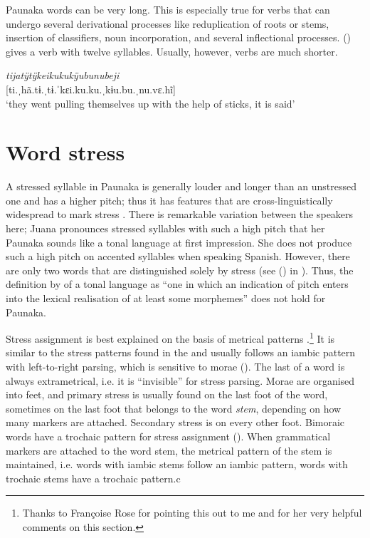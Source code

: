 Paunaka words can be very long. This is especially true for verbs that can undergo several derivational processes like reduplication of roots or stems, insertion of classifiers, noun incorporation, and several inflectional processes. () gives a verb with twelve syllables. Usually, however, verbs are much shorter.


\ea\label{ex:12syllables}
\textit{tijatÿtÿkeikukukÿubunubeji}\\
{[ti.ˌhã.tɨ.ˌtɨ.ˈkɛi.ku.ku.ˌkɨu.bu.ˌnu.vɛ.hĩ]}\\
‘they went pulling themselves up with the help of sticks, it is said’ \trailingcitation{[jxx-p151016l-2]}
\xe


\section{Word stress} \label{sec:Stress}

A stressed syllable in Paunaka is generally louder and longer than an unstressed one and has a higher pitch; thus it has features that are cross-linguistically wide\-spread to mark stress \citep[cf.][195]{Kager2007}. There is remarkable variation between the speakers here; Juana pronounces stressed syllables with such a high pitch that her Paunaka sounds like a tonal language at first impression. She does not produce such a high pitch on accented syllables when speaking Spanish.
However, there are only two words that are distinguished solely by stress (see () in ). Thus, the definition by \citet[230]{Yip2007} of a tonal language as “one in which an indication of pitch enters into the lexical realisation of at least some morphemes” does not hold for Paunaka.

Stress assignment is best explained on the basis of metrical patterns \citep[cf.][]{Hayes1995}.\footnote{Thanks to Françoise Rose for pointing this out to me and for her very helpful comments on this section.}  It is similar to the stress patterns found in the  \citep{CarvalhoRose2018,Rose2019} and usually follows an iambic pattern with left-to-right parsing, which is sensitive to morae (). The last  of a word is always extrametrical, i.e. it is “invisible” for stress parsing. Morae are organised into feet, and primary stress is usually found on the last foot of the word, sometimes on the last foot that belongs to the word \textit{stem}, depending on how many markers are attached. Secondary stress is on every other foot.
Bimoraic words have a trochaic pattern for stress assignment (). When grammatical markers are attached to the word stem, the metrical pattern of the stem is maintained, i.e. words with iambic stems follow an iambic pattern, words with trochaic stems have a trochaic pattern.c

